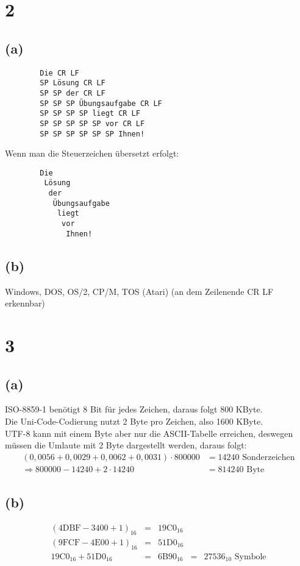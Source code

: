 \documentclass[a4paper]{scrartcl}
\begin{document}
		
\section{2}
	\subsection{(a)}
		\begin{verbatim}
		Die CR LF
		SP Lösung CR LF
		SP SP der CR LF
		SP SP SP Übungsaufgabe CR LF
		SP SP SP SP liegt CR LF
		SP SP SP SP SP vor CR LF
		SP SP SP SP SP SP Ihnen!
		\end{verbatim}
		Wenn man die Steuerzeichen übersetzt erfolgt:
		\begin{verbatim}
		Die
		 Lösung
		  der
		   Übungsaufgabe
		    liegt
		     vor
		      Ihnen!
		\end{verbatim}
			
	\subsection{(b)}
		Windows, DOS, OS/2, CP/M, TOS (Atari) (an dem Zeilenende CR LF erkennbar)
			
			
\section{3}
	\subsection{(a)}
		ISO-8859-1 benötigt 8 Bit für jedes Zeichen, daraus folgt 800 KByte. \\
		Die Uni-Code-Codierung nutzt 2 Byte pro Zeichen, also 1600 KByte. \\
		UTF-8 kann mit einem Byte aber nur die ASCII-Tabelle erreichen, deswegen müssen die Umlaute 
		mit 2 Byte dargestellt werden, 
		daraus folgt:
		\begin{align}
			(0,0056+0,0029+0,0062+0,0031)\cdot 800000 &= 14240 \text{ Sonderzeichen} \\
			\Rightarrow 800000-14240+2\cdot 14240 &= 814240 \text{ Byte}				
		\end{align}
		
	\subsection{(b)}
		\[
		\begin{array}{rclcl}
			(4\text{DBF}-3400+1)_{16} &=& 19\text{C}0_{16} \\
			(9\text{FCF}-4\text{E}00+1)_{16} &=& 51\text{D}0_{16} \\
			19\text{C}0_{16} + 51\text{D}0_{16} &=& 6\text{B}90_{16} &=&  27536_{10}
			\text{ Symbole}
		\end{array}
		\]
		
\end{document}
